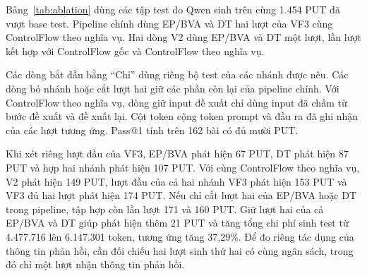 Bảng~\ref{tab:ablation} dùng các tập test do Qwen sinh trên cùng 1.454 PUT đã vượt base test. Pipeline chính dùng EP/BVA và DT hai lượt của VF3 cùng ControlFlow theo nghĩa vụ. Hai dòng V2 dùng EP/BVA và DT một lượt, lần lượt kết hợp với ControlFlow gốc và ControlFlow theo nghĩa vụ.

Các dòng bắt đầu bằng “Chỉ” dùng riêng bộ test của các nhánh được nêu. Các dòng bỏ nhánh hoặc cắt lượt hai giữ các phần còn lại của pipeline chính. Với ControlFlow theo nghĩa vụ, dòng giữ input đề xuất chỉ dùng input đã chấm từ bước đề xuất và đề xuất lại. Cột token cộng token prompt và đầu ra đã ghi nhận của các lượt tương ứng. Pass@1 tính trên 162 bài có đủ mười PUT.

Khi xét riêng lượt đầu của VF3, EP/BVA phát hiện 67 PUT, DT phát hiện 87 PUT và hợp hai nhánh phát hiện 107 PUT. Với cùng ControlFlow theo nghĩa vụ, V2 phát hiện 149 PUT, lượt đầu của cả hai nhánh VF3 phát hiện 153 PUT và VF3 đủ hai lượt phát hiện 174 PUT. Nếu chỉ cắt lượt hai của EP/BVA hoặc DT trong pipeline, tập hợp còn lần lượt 171 và 160 PUT. Giữ lượt hai của cả EP/BVA và DT giúp phát hiện thêm 21 PUT và tăng tổng chi phí sinh test từ 4.477.716 lên 6.147.301 token, tương ứng tăng 37,29\%. Để đo riêng tác dụng của thông tin phản hồi, cần đối chiếu hai lượt sinh thứ hai có cùng ngân sách, trong đó chỉ một lượt nhận thông tin phản hồi.

